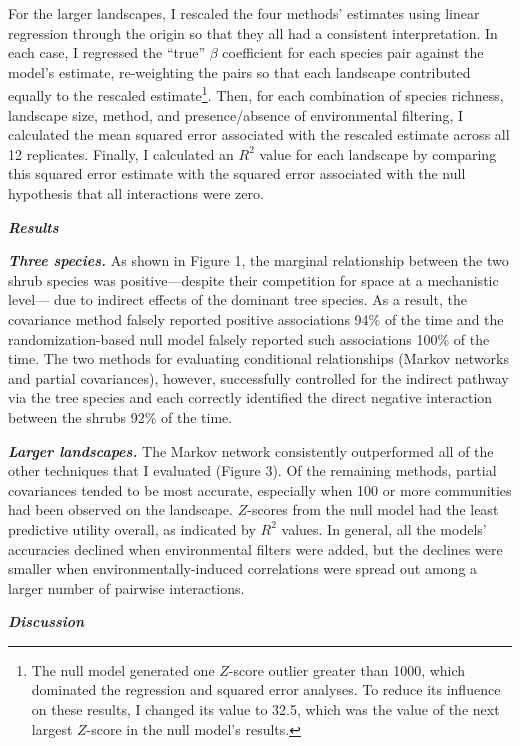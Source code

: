 \documentclass[12pt,]{article}
\begin{document}
\begin{spacing}{1.9}
\begin{flushleft}
For the larger landscapes, I rescaled the four methods' estimates using
linear regression through the origin so that they all had a consistent
interpretation. In each case, I regressed the ``true'' \(\beta\)
coefficient for each species pair against the model's estimate,
re-weighting the pairs so that each landscape contributed equally to the
rescaled estimate\footnote{The null model generated one \(Z\)-score
  outlier greater than 1000, which dominated the regression and squared
  error analyses. To reduce its influence on these results, I changed
  its value to 32.5, which was the value of the next largest \(Z\)-score
  in the null model's results.}. Then, for each combination of species
richness, landscape size, method, and presence/absence of environmental
filtering, I calculated the mean squared error associated with the
rescaled estimate across all 12 replicates. Finally, I calculated an
\(R^2\) value for each landscape by comparing this squared error
estimate with the squared error associated with the null hypothesis that
all interactions were zero.

\textbf{\emph{Results}}

\textbf{\emph{Three species.}} As shown in Figure 1, the marginal
relationship between the two shrub species was positive---despite their
competition for space at a mechanistic level--- due to indirect effects
of the dominant tree species. As a result, the covariance method falsely
reported positive associations 94\% of the time and the
randomization-based null model falsely reported such associations 100\%
of the time. The two methods for evaluating conditional relationships
(Markov networks and partial covariances), however, successfully
controlled for the indirect pathway via the tree species and each
correctly identified the direct negative interaction between the shrubs
92\% of the time.

\textbf{\emph{Larger landscapes.}} The Markov network consistently
outperformed all of the other techniques that I evaluated (Figure 3). Of
the remaining methods, partial covariances tended to be most accurate,
especially when 100 or more communities had been observed on the
landscape. \(Z\)-scores from the null model had the least predictive
utility overall, as indicated by \(R^2\) values. In general, all the
models' accuracies declined when environmental filters were added, but
the declines were smaller when environmentally-induced correlations were
spread out among a larger number of pairwise interactions.

\textbf{\emph{Discussion}}


\end{flushleft}
\end{spacing}
\end{document}
